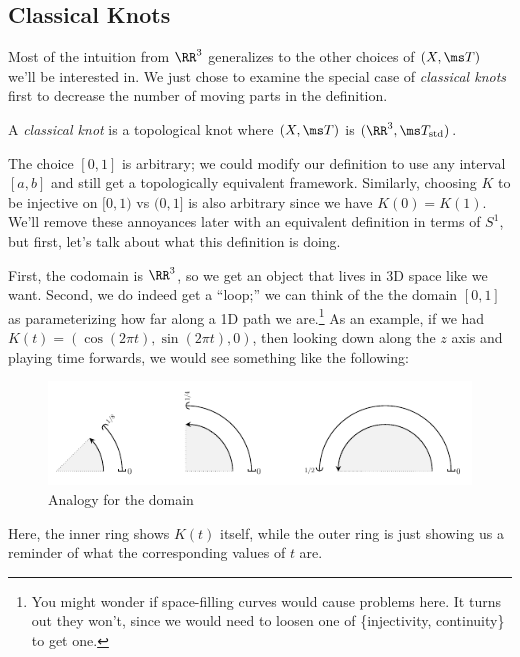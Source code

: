 \subsection{Classical Knots}
Most of the intuition from $\RR^3$ generalizes to the other choices of
$(X, \ms T)$ we'll be interested in. We just chose to examine the
special case of \emph{classical knots} first to decrease the number of
moving parts in the definition.
\begin{definition}\label{def:ClassKnotInt}
  A \emph{classical knot} is a topological knot where $(X,\ms T)$ is
  $(\RR^3, \ms T_{\rm std})$.%
\end{definition}
\begin{aside}
  The choice $[0,1]$ is arbitrary; we could modify our definition to
  use any interval $[a,b]$ and still get a topologically equivalent
  framework. Similarly, choosing $K$ to be injective on $[0,1)$ vs
  $(0,1]$ is also arbitrary since we have $K(0) = K(1)$. We'll remove
  these annoyances later with an equivalent definition in terms of
  $S^1$, but first, let's talk about what this definition is doing.
\end{aside}

First, the codomain is $\RR^3$, so we get an object that lives in 3D
space like we want. Second, we do indeed get a ``loop;'' we can think
of the the domain $[0,1]$ as parameterizing how far along a 1D path we
are.\footnote{You might wonder if space-filling curves would cause
  problems here. It turns out they won't, since we would need to
  loosen one of \{injectivity, continuity\} to get one.} As an
example, if we had $K(t) = (\cos(2\pi t), \sin(2\pi t), 0)$, then
looking down along the $z$ axis and playing time forwards, we would
see something like the following:
\begin{figure}[H]
  \centering
  \includegraphics[scale=1.4]{figures/background/dist-along-knot.pdf}
  \caption{Analogy for the domain}
  \label{fig:DomainAnalogy}
\end{figure}
\noindent Here, the inner ring shows $K(t)$ itself, while the outer
ring is just showing us a reminder of what the corresponding values of
$t$ are.

